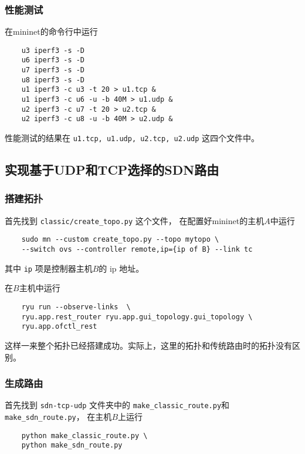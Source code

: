 \subsubsection{性能测试}

在mininet的命令行中运行

\begin{lstlisting}
	u3 iperf3 -s -D
	u6 iperf3 -s -D
	u7 iperf3 -s -D
	u8 iperf3 -s -D
	u1 iperf3 -c u3 -t 20 > u1.tcp &
	u1 iperf3 -c u6 -u -b 40M > u1.udp &
	u2 iperf3 -c u7 -t 20 > u2.tcp &
	u2 iperf3 -c u8 -u -b 40M > u2.udp &
\end{lstlisting}

性能测试的结果在 \texttt{u1.tcp, u1.udp, u2.tcp, u2.udp} 这四个文件中。

\subsection{实现基于UDP和TCP选择的SDN路由}

\subsubsection{搭建拓扑}

首先找到 \texttt{classic/create\_{}topo.py} 这个文件，
在配置好mininet的主机$A$中运行
\begin{lstlisting}
	sudo mn --custom create_topo.py --topo mytopo \
	--switch ovs --controller remote,ip={ip of B} --link tc
\end{lstlisting}

其中 \texttt{ip} 项是控制器主机$B$的 ip 地址。

在$B$主机中运行

\begin{lstlisting}
	ryu run --observe-links  \
	ryu.app.rest_router ryu.app.gui_topology.gui_topology \
	ryu.app.ofctl_rest
\end{lstlisting}

这样一来整个拓扑已经搭建成功。实际上，这里的拓扑和传统路由时的拓扑没有区别。

\subsubsection{生成路由}
首先找到 \texttt{sdn-tcp-udp} 文件夹中的 
\texttt{make\_classic\_route.py}和
\texttt{make\_sdn\_route.py}，
在主机$B$上运行

\begin{lstlisting}
	python make_classic_route.py \
	python make_sdn_route.py
\end{lstlisting}

